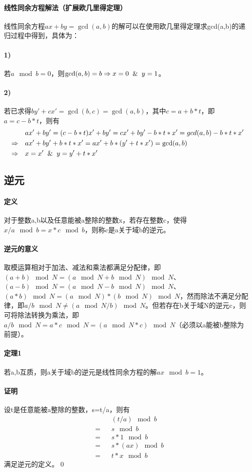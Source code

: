 \documentclass[UTF8]{ctexart}
\begin{document}
    \paragraph{线性同余方程解法（扩展欧几里得定理）} 线性同余方程$ax+by=\gcd(a,b)$的解可以在使用欧几里得定理求gcd(a,b)的递归过程中得到，具体为：
    \paragraph{1)} 若$a\mod b=0$，则$\gcd(a,b)=b\Rightarrow x=0 \And y=1$。
    \paragraph{2)} 若已求得$by'+cx'=\gcd(b,c)=\gcd(a,b)$，其中$c=a+b*t$，即$a=c-b*t$，则有
    \begin{equation}
        \begin{aligned}
            && &ax'+by'=(c-b*t)x'+by'=cx'+by'-b*t*x'=gcd(a,b)-b*t*x'\\
            &\Rightarrow& &ax'+by'+b*t*x'=ax'+b*(y'+t*x')=\gcd(a,b)\\
            &\Rightarrow& &x=x' \And y=y'+t*x'
        \end{aligned}
    \end{equation}
    \subsection{逆元}
    \paragraph{定义} 对于整数a,b以及任意能被a整除的整数x，若存在整数c，使得$x/a \mod b=x*c \mod b$，则称c是a关于域b的逆元。
    \paragraph{逆元的意义} 取模运算相对于加法、减法和乘法都满足分配律，即$(a+b)\mod N=(a\mod N+b\mod N)\mod N$、$(a-b)\mod N=(a\mod N-b\mod N)\mod N$、$(a*b)\mod N=(a\mod N)*(b\mod N)\mod N$，然而除法不满足分配律，即$a/b\mod N\neq (a\mod N/b)\mod N$。但若存在b关于域N的逆元c，则可将除法转换为乘法，即$a/b\mod N=a*c\mod N=(a\mod N*c)\mod N$（必须以a能被b整除为前提）。
    \paragraph{定理1} 若a,b互质，则a关于域b的逆元是线性同余方程的解$ax\mod b=1$。
    \paragraph{证明} 设t是任意能被a整除的整数，s=t/a，则有
    \begin{equation}
        \begin{aligned}
            & & &(t/a)\mod b\\
            &=& &s\mod b\\
            &=& &s*1\mod b\\
            &=& &s*(ax)\mod b\\
            &=& &t*x\mod b
        \end{aligned}
    \end{equation}
    满足逆元的定义。\qed
\end{document}
